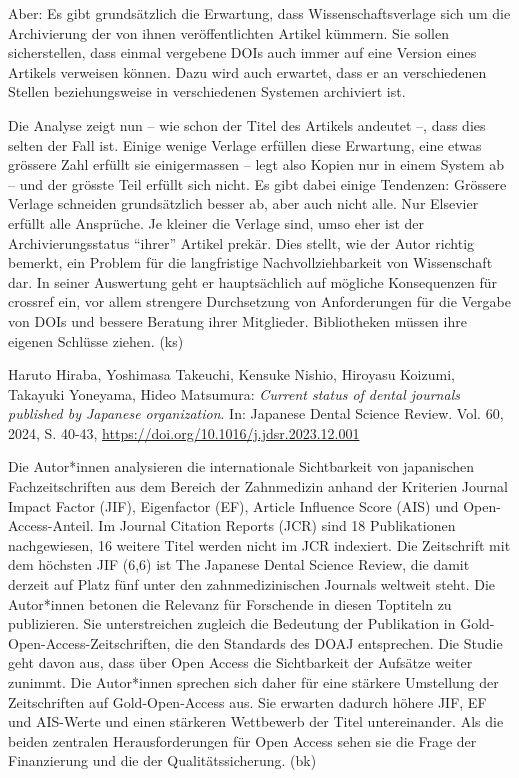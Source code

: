 \documentclass[a4paper,
fontsize=11pt,
oneside,
numbers=noperiodatend,
parskip=half-,
bibliography=totoc,
final
]{scrartcl}
\begin{document}
Aber: Es gibt grundsätzlich die Erwartung, dass Wissenschaftsverlage
sich um die Archivierung der von ihnen veröffentlichten Artikel kümmern.
Sie sollen sicherstellen, dass einmal vergebene DOIs auch immer auf eine
Version eines Artikels verweisen können. Dazu wird auch erwartet, dass
er an verschiedenen Stellen beziehungsweise in verschiedenen Systemen
archiviert ist.

Die Analyse zeigt nun -- wie schon der Titel des Artikels andeutet --,
dass dies selten der Fall ist. Einige wenige Verlage erfüllen diese
Erwartung, eine etwas grössere Zahl erfüllt sie einigermassen -- legt
also Kopien nur in einem System ab -- und der grösste Teil erfüllt sich
nicht. Es gibt dabei einige Tendenzen: Grössere Verlage schneiden
grundsätzlich besser ab, aber auch nicht alle. Nur Elsevier erfüllt alle
Ansprüche. Je kleiner die Verlage sind, umso eher ist der
Archivierungsstatus \enquote{ihrer} Artikel prekär. Dies stellt, wie der
Autor richtig bemerkt, ein Problem für die langfristige
Nachvollziehbarkeit von Wissenschaft dar. In seiner Auswertung geht er
hauptsächlich auf mögliche Konsequenzen für crossref ein, vor allem
strengere Durchsetzung von Anforderungen für die Vergabe von DOIs und
bessere Beratung ihrer Mitglieder. Bibliotheken müssen ihre eigenen
Schlüsse ziehen. (ks)

Haruto Hiraba, Yoshimasa Takeuchi, Kensuke Nishio, Hiroyasu Koizumi,
Takayuki Yoneyama, Hideo Matsumura: \emph{Current status of dental
journals published by Japanese organization}. In: Japanese Dental
Science Review. Vol. 60, 2024, S. 40-43,
\url{https://doi.org/10.1016/j.jdsr.2023.12.001}

Die Autor*innen analysieren die internationale Sichtbarkeit von
japanischen Fachzeitschriften aus dem Bereich der Zahnmedizin anhand der
Kriterien Journal Impact Factor (JIF), Eigenfactor (EF), Article
Influence Score (AIS) und Open-Access-Anteil. Im Journal Citation
Reports (JCR) sind 18 Publikationen nachgewiesen, 16 weitere Titel
werden nicht im JCR indexiert. Die Zeitschrift mit dem höchsten JIF
(6,6) ist The Japanese Dental Science Review, die damit derzeit auf
Platz fünf unter den zahnmedizinischen Journals weltweit steht. Die
Autor*innen betonen die Relevanz für Forschende in diesen Toptiteln zu
publizieren. Sie unterstreichen zugleich die Bedeutung der Publikation
in Gold-Open-Access-Zeitschriften, die den Standards des DOAJ
entsprechen. Die Studie geht davon aus, dass über Open Access die
Sichtbarkeit der Aufsätze weiter zunimmt. Die Autor*innen sprechen sich
daher für eine stärkere Umstellung der Zeitschriften auf
Gold-Open-Access aus. Sie erwarten dadurch höhere JIF, EF und AIS-Werte
und einen stärkeren Wettbewerb der Titel untereinander. Als die beiden
zentralen Herausforderungen für Open Access sehen sie die Frage der
Finanzierung und die der Qualitätssicherung. (bk)
\end{document}
